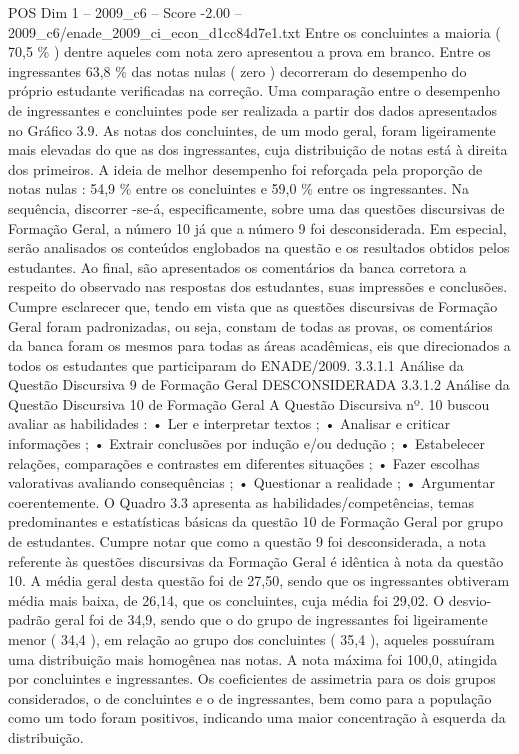 \begin{textsample}{POS Dim 1 – 2009\_c6 – Score -2.00 – 2009\_c6/enade\_2009\_ci\_econ\_d1cc84d7e1.txt}
Entre os concluintes a maioria ( 70,5 \% ) dentre aqueles com nota zero apresentou a prova em branco.
Entre os ingressantes 63,8 \% das notas nulas ( zero ) decorreram do desempenho do próprio estudante verificadas na correção.
Uma comparação entre o desempenho de ingressantes e concluintes pode ser realizada a partir dos dados apresentados no Gráfico 3.9.
As notas dos concluintes, de um modo geral, foram ligeiramente mais elevadas do que as dos ingressantes, cuja distribuição de notas está à direita dos primeiros.
A ideia de melhor desempenho foi reforçada pela proporção de notas nulas : 54,9 \% entre os concluintes e 59,0 \% entre os ingressantes.
Na sequência, discorrer -se-á, especificamente, sobre uma das questões discursivas de Formação Geral, a número 10 já que a número 9 foi desconsiderada.
Em especial, serão analisados os conteúdos englobados na questão e os resultados obtidos pelos estudantes.
Ao final, são apresentados os comentários da banca corretora a respeito do observado nas respostas dos estudantes, suas impressões e conclusões.
Cumpre esclarecer que, tendo em vista que as questões discursivas de Formação Geral foram padronizadas, ou seja, constam de todas as provas, os comentários da banca foram os mesmos para todas as áreas acadêmicas, eis que direcionados a todos os estudantes que participaram do ENADE/2009. 3.3.1.1 Análise da Questão Discursiva 9 de Formação Geral DESCONSIDERADA 3.3.1.2 Análise da Questão Discursiva 10 de Formação Geral A Questão Discursiva nº. 10 buscou avaliar as habilidades : • Ler e interpretar textos ; • Analisar e criticar informações ; • Extrair conclusões por indução e/ou dedução ; • Estabelecer relações, comparações e contrastes em diferentes situações ; • Fazer escolhas valorativas avaliando consequências ; • Questionar a realidade ; • Argumentar coerentemente.
O Quadro 3.3 apresenta as habilidades/competências, temas predominantes e estatísticas básicas da questão 10 de Formação Geral por grupo de estudantes.
Cumpre notar que como a questão 9 foi desconsiderada, a nota referente às questões discursivas da Formação Geral é idêntica à nota da questão 10.
A média geral desta questão foi de 27,50, sendo que os ingressantes obtiveram média mais baixa, de 26,14, que os concluintes, cuja média foi 29,02.
O desvio-padrão geral foi de 34,9, sendo que o do grupo de ingressantes foi ligeiramente menor ( 34,4 ), em relação ao grupo dos concluintes ( 35,4 ), aqueles possuíram uma distribuição mais homogênea nas notas.
A nota máxima foi 100,0, atingida por concluintes e ingressantes.
Os coeficientes de assimetria para os dois grupos considerados, o de concluintes e o de ingressantes, bem como para a população como um todo foram positivos, indicando uma maior concentração à esquerda da distribuição.

\end{textsample}
